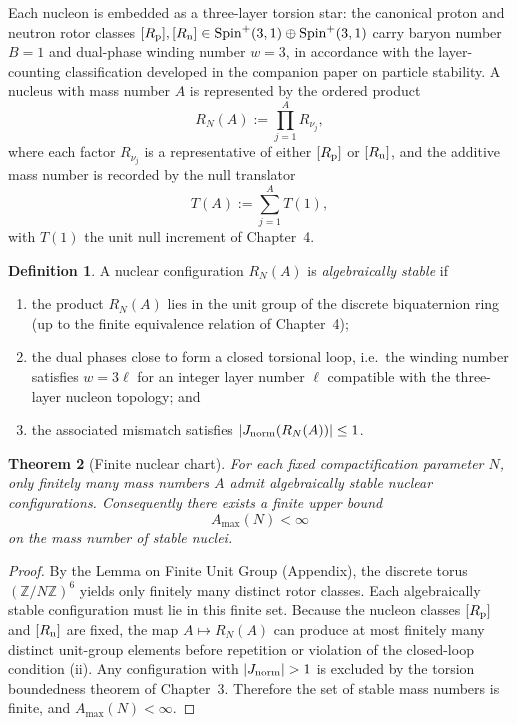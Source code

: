 \documentclass[dvipdfmx,a4paper]{article}
\newtheorem{theorem}{Theorem}[section]
\theoremstyle{definition}
\newtheorem{definition}[theorem]{Definition}
\theoremstyle{remark}
\newcommand{\Jnorm}{J_{\rm norm}}
\begin{document}
Each nucleon is embedded as a three-layer torsion star: the canonical proton and neutron rotor classes \( [R_{\rm p}], [R_{\rm n}] \in \mathrm{Spin}^+(3,1) \oplus \mathrm{Spin}^+(3,1) \) carry baryon number \(B=1\) and dual-phase winding number \(w=3\), in accordance with the layer-counting classification developed in the companion paper on particle stability. A nucleus with mass number \(A\) is represented by the ordered product
\[
R_N(A) := \prod_{j=1}^{A} R_{\nu_j},
\]
where each factor \(R_{\nu_j}\) is a representative of either \([R_{\rm p}]\) or \([R_{\rm n}]\), and the additive mass number is recorded by the null translator
\[
T(A) := \sum_{j=1}^{A} T(1),
\]
with \(T(1)\) the unit null increment of Chapter~4.

\begin{definition}
A nuclear configuration \(R_N(A)\) is \emph{algebraically stable} if
\begin{enumerate}[label=(\roman*)]
  \item the product \(R_N(A)\) lies in the unit group of the discrete biquaternion ring (up to the finite equivalence relation of Chapter~4);
  \item the dual phases close to form a closed torsional loop, i.e.\ the winding number satisfies \(w = 3\ell\) for an integer layer number \(\ell\) compatible with the three-layer nucleon topology; and
  \item the associated mismatch satisfies \(|\Jnorm(R_N(A))| \leq 1\).
\end{enumerate}
\end{definition}

\begin{theorem}[Finite nuclear chart]
For each fixed compactification parameter \(N\), only finitely many mass numbers \(A\) admit algebraically stable nuclear configurations. Consequently there exists a finite upper bound
\[
A_{\max}(N) < \infty
\]
on the mass number of stable nuclei.
\end{theorem}

\begin{proof}
By the Lemma on Finite Unit Group (Appendix), the discrete torus \((\mathbb{Z}/N\mathbb{Z})^6\) yields only finitely many distinct rotor classes. Each algebraically stable configuration must lie in this finite set. Because the nucleon classes \([R_{\rm p}]\) and \([R_{\rm n}]\) are fixed, the map \(A \mapsto R_N(A)\) can produce at most finitely many distinct unit-group elements before repetition or violation of the closed-loop condition (ii). Any configuration with \(|\Jnorm| > 1\) is excluded by the torsion boundedness theorem of Chapter~3. Therefore the set of stable mass numbers is finite, and \(A_{\max}(N) < \infty\).
\end{proof}
\end{document}
